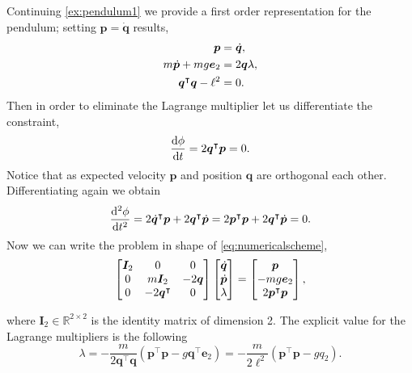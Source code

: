 \begin{example}
	\label{ex:pendulum2}
	Continuing \cref{ex:pendulum1} we provide a first
	order representation for the pendulum; setting
	$\bm{p} = \dot{\bm{q}}$ results, 
	\begin{subequations}
		\begin{align*}
			\bm{p} &= \dot{\bm{q}},\\
			m\dot{\bm{p}} + mg\bm{e}_{2} &= 2\bm{q}\lambda,\\
			\bm{q}^{\intercal}\bm{q} - \ell^{2} &= 0.
		\end{align*}
	\end{subequations}
	Then in order to eliminate the Lagrange multiplier let us differentiate the constraint,
	\begin{equation*}
		\frac{\mathop{}\!\mathrm{d}\phi}{\mathop{}\!\mathrm{d} t} = 2\bm{q}^{\intercal}\bm{p} = 0.
	\end{equation*}
	Notice that as expected velocity $\bm{p}$ and position 
	$\bm{q}$ are orthogonal each other. Differentiating again we obtain 
	\begin{equation*}
		\frac{\mathop{}\!\mathrm{d}^{2}\phi}{\mathop{}\!\mathrm{d} t^2} 
		= 2\dot{\bm{q}}^{\intercal}\bm{p} + 2\bm{q}^{\intercal}\dot{\bm{p}}
		= 2\bm{p}^{\intercal}\bm{p} + 2\bm{q}^{\intercal}\dot{\bm{p}} = 0.
	\end{equation*}
	Now we can write the problem in shape of \cref{eq:numericalscheme}, 
	\begin{equation}
		\label{eq:numericalschemependulum}
		\begin{bmatrix}
			\bm{I}_{2} 	& 0 & 0 \\
			0 			& m\bm{I}_{2} & -2\bm{q} \\ 
			0 			& -2\bm{q}^{\intercal}  & 0
		\end{bmatrix}
		\begin{bmatrix}
			\dot{\bm{q}} \\
			\dot{\bm{p}} \\
			\lambda
		\end{bmatrix}
		= 
		\begin{bmatrix}
			\bm{p} \\
			-mg\bm{e}_{2}\\
			2\bm{p}^{\intercal}\bm{p}
		\end{bmatrix},
	\end{equation}
\end{example}
where $\bm{I}_{2}\in\mathbb{R}^{2\times 2}$ is the identity matrix of dimension 2.
The explicit value for the Lagrange multipliers is the following
\begin{equation}
	\label{eq:explicitlambdapendulum}
	\lambda = -\frac{m}{2\bm{q}^{\intercal}\bm{q}}
	\left(\bm{p}^{\intercal}\bm{p}-g\bm{q}^{\intercal}\bm{e}_{2}\right)
	= -\frac{m}{2\ell^{2}}\left(\bm{p}^{\intercal}\bm{p}-gq_{2}\right). 
\end{equation}

